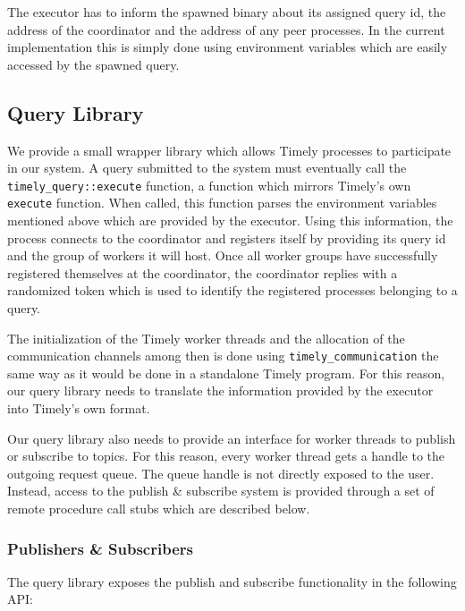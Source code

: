 The executor has to inform the spawned binary about its assigned query id,
the address of the coordinator and the address of any peer processes. In the
current implementation this is simply done using environment variables which
are easily accessed by the spawned query.


\subsection{Query Library}

We provide a small wrapper library which allows Timely processes to participate
in our system. A query submitted to the system must eventually call the 
\lstinline{timely_query::execute} function, a function which mirrors Timely's
own \lstinline{execute} function. When called, this function parses the
environment variables mentioned above which are provided by the executor.
Using this information, the process connects to the coordinator and registers
itself by providing its query id and the group of workers it will host. Once
all worker groups have successfully registered themselves at the coordinator,
the coordinator replies with a randomized token which is used to identify
the registered processes belonging to a query. 

The initialization of the Timely worker threads and the allocation of the
communication channels among then is done using \lstinline{timely_communication}
the same way as it would be done in a standalone Timely program. For this
reason, our query library needs to translate the information provided by the
executor into Timely's own format.

Our query library also needs to provide an interface for worker threads to
publish or subscribe to topics. For this reason, every worker thread gets
a handle to the outgoing request queue. The queue handle is not directly exposed
to the user. Instead, access to the publish \& subscribe system is provided
through a set of remote procedure call stubs which are described below.

\subsubsection{Publishers \& Subscribers}

The query library exposes the publish and subscribe functionality in the
following API:

